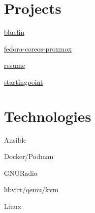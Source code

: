 \documentclass[]{src/friggeri-cv}
\begin{document}
\begin{aside}
  \section{Projects}
    \item[\rightarrow]\href{https://github.com/bpbeatty/bluefin}{bluefin}
    \item[\rightarrow]\href{https://github.com/bpbeatty/fedora-coreos-proxmox}{fedora-coreos-proxmox}
    \item[\rightarrow]\href{https://github.com/bpbeatty/resume}{resume}
    \item[\rightarrow]\href{https://github.com/bpbeatty/startingpoint}{startingpoint}
    ~
  \section{Technologies}
    \item[\rightarrow]{Ansible}
    \item[\rightarrow]{Docker/Podman}
    \item[\rightarrow]{GNURadio}
    \item[\rightarrow]{libvirt/qemu/kvm}
    \item[\rightarrow]{Linux}
    ~
\end{aside}
\end{document}
